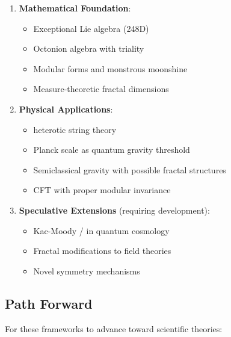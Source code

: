 \begin{framework}
\begin{enumerate}
    \item \textbf{Mathematical Foundation}:
    \begin{itemize}
        \item Exceptional Lie algebra  (248D)
        \item Octonion algebra with triality
        \item Modular forms and monstrous moonshine
        \item Measure-theoretic fractal dimensions
    \end{itemize}

    \item \textbf{Physical Applications}:
    \begin{itemize}
        \item {} heterotic string theory
        \item Planck scale as quantum gravity threshold
        \item Semiclassical gravity with possible fractal structures
        \item CFT with proper modular invariance
    \end{itemize}

    \item \textbf{Speculative Extensions} (requiring development):
    \begin{itemize}
        \item Kac-Moody / in quantum cosmology
        \item Fractal modifications to field theories
        \item Novel symmetry mechanisms
    \end{itemize}
\end{enumerate}
\end{framework}

\subsection{Path Forward}

For these frameworks to advance toward scientific theories:

